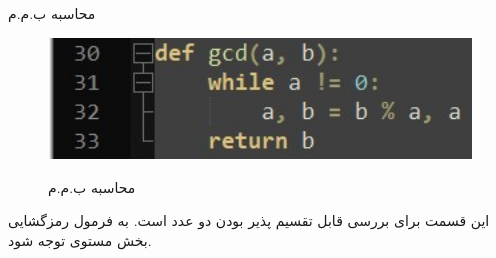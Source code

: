 \SubProblem
{محاسبه ب.م.م}
{
\begin{figure}[H]
    \centering
    \includegraphics[width=15cm]{Images/F3.jpg}
    \label{fig:label}
    \caption{محاسبه ب.م.م}
\end{figure}

این قسمت برای بررسی قابل تقسیم پذیر بودن دو عدد است.
به فرمول رمزگشایی بخش مستوی توجه شود.
}
